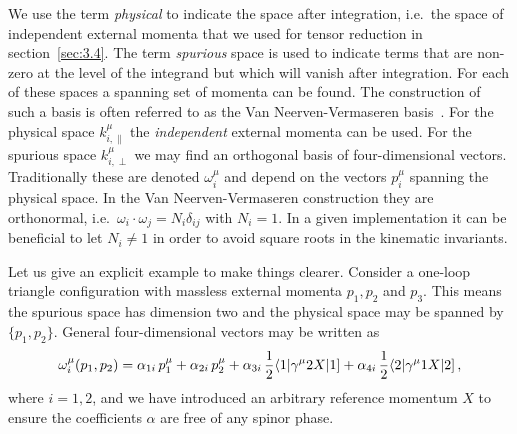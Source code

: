 We use the term \textit{physical} to indicate the space after integration, i.e.\
the space of independent external momenta that we used for tensor reduction in section~\ref{sec:3.4}.
The term \textit{spurious} space is used to indicate terms that are non-zero at
the level of the integrand but which will vanish after integration.
For each of these spaces a spanning set of momenta can be found. The construction
of such a basis is often referred to as the Van Neerven-Vermaseren
basis~\cite{ch3_vanNeerven:1983vr}. For the physical space $k^\mu_{i,\parallel}$ the
\textit{independent} external momenta can be used. For the spurious space $k^\mu_{i,\perp}$ we may find an orthogonal basis of
four-dimensional vectors. Traditionally these are denoted $\omega_i^\mu$ and depend on the vectors $p_i^\mu$ spanning the physical space.
In the Van Neerven-Vermaseren construction they are orthonormal, i.e.\ $\omega_i\cdot \omega_j = N_i \delta_{ij}$ with $N_i=1$.
In a given implementation it can be beneficial to let $N_i \neq 1$ in order to
avoid square roots in the kinematic invariants.

Let us give an explicit example to make things clearer. Consider a one-loop
triangle configuration with massless external momenta $p_1, p_2$ and $p_3$.
This means the spurious space has dimension two and the physical space may be
spanned by $\{p_1, p_2\}$. General four-dimensional vectors may be written as
\begin{equation}
  \omega_i^\mu(p_1,p_2) = \alpha_{1i} \, p_1^\mu + \alpha_{2i} \, p_2^\mu + \alpha_{3i} \, \frac{1}{2} \langle 1 | \gamma^\mu 2 X | 1 ] + \alpha_{4i} \, \frac{1}{2} \langle 2 | \gamma^\mu 1 X | 2 ] \,,
  \label{eq:spuriousvectorexampeEQ1}
\end{equation}
where $i=1,2$, and we have introduced an arbitrary reference momentum $X$ to ensure the coefficients $\alpha$ are free of any spinor phase.

